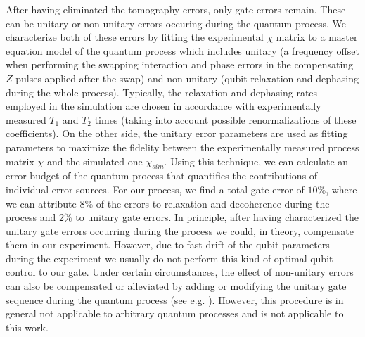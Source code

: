After having eliminated the tomography errors, only gate errors remain. These can be unitary or non-unitary errors occuring during the quantum process. We characterize both of these errors by fitting the experimental $\chi$ matrix to a master equation model of the quantum process which includes unitary (a frequency offset when performing the swapping interaction and phase errors in the compensating $Z$ pulses applied after the swap) and non-unitary (qubit relaxation and dephasing during the whole process). Typically, the relaxation and dephasing rates employed in the simulation are chosen in accordance with experimentally measured $T_1$ and $T_2$ times (taking into account possible renormalizations of these coefficients). On the other side, the unitary error parameters are used as fitting parameters to maximize the fidelity between the experimentally measured process matrix $\chi$ and the simulated one $\chi_{sim}$. Using this technique, we can calculate an error budget of the quantum process that quantifies the contributions of individual error sources. For our process, we find a total gate error of $10 \%$, where we can attribute $8\%$ of the errors to relaxation and decoherence during the process and $2\%$ to unitary gate errors. In principle, after having characterized the unitary gate errors occurring during the process we could, in theory, compensate them in our experiment. However, due to fast drift of the qubit parameters during the experiment we usually do not perform this kind of optimal qubit control to our gate. Under certain circumstances, the effect of non-unitary errors can also be compensated or alleviated by adding or modifying the unitary gate sequence during the quantum process (see e.g. \citep{lange_universal_2010}). However, this procedure is in general not applicable to arbitrary quantum processes and is not applicable to this work.

\smallskip


